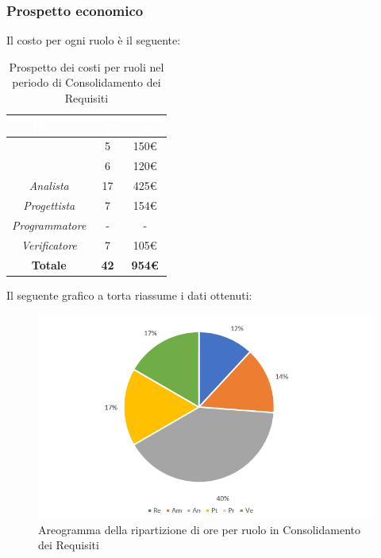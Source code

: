 \subsubsection{Prospetto economico}
Il costo per ogni ruolo è il seguente:
\begin{table}[H]
	\begin{center}
		\begin{tabular}{ |c c c|}
		\rowcolor{darkblue} 
		\textcolor{white}{\textbf{Ruolo}} & \textcolor{white}{\textbf{Ore}} & \textcolor{white}{\textbf{Costo}} \\ \hline
		\textit{\Responsabile} 		& 5 	& 150€ \\ \hline
		\textit{\Amministratore} 	& 6 	& 120€ \\ \hline
		\textit{Analista} 			& 17 	& 425€ \\ \hline
		\textit{Progettista} 		& 7 	& 154€ \\ \hline
		\textit{Programmatore}  	& - 	& - \\ \hline
		\textit{Verificatore} 		& 7 	& 105€ \\ \hline
		\textbf{Totale} 			& \textbf{42} & \textbf{954€} \\ \hline
		\end{tabular}
	\caption{ Prospetto dei costi per ruoli nel periodo di Consolidamento dei Requisiti}
	\end{center}
\end{table}
Il seguente grafico a torta riassume i dati ottenuti:
\begin{figure}[H]
    \centering
    \includegraphics[scale = 0.75]{Immagini/ConsolidamentoTorta.png}
    \caption{Areogramma della ripartizione di ore per ruolo in Consolidamento dei Requisiti}
    \label{fig:Areogramma ripartizione ore, periodo di Consolidamento dei Requisiti}
\end{figure}
\newpage

